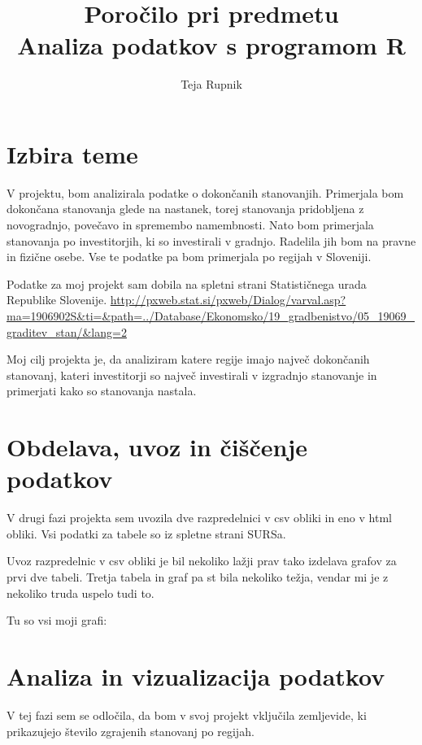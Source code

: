 \documentclass[11pt,a4paper]{article}
\begin{document}
\title{Poročilo pri predmetu \\
Analiza podatkov s programom R}
\author{Teja Rupnik}
\maketitle

\section{Izbira teme}

V projektu, bom analizirala podatke o dokončanih stanovanjih. Primerjala bom dokončana stanovanja glede na nastanek, torej stanovanja pridobljena z novogradnjo, povečavo in spremembo namembnosti. Nato bom primerjala stanovanja po investitorjih, ki so investirali v gradnjo. Radelila jih bom na pravne in fizične osebe. Vse te podatke pa bom primerjala po regijah v Sloveniji.

Podatke za moj projekt sam dobila na spletni strani Statističnega urada Republike Slovenije. 
\url{http://pxweb.stat.si/pxweb/Dialog/varval.asp?ma=1906902S&ti=&path=../Database/Ekonomsko/19_gradbenistvo/05_19069_graditev_stan/&lang=2}

Moj cilj projekta je, da analiziram katere regije imajo največ dokončanih stanovanj, kateri investitorji so največ investirali v izgradnjo stanovanje in primerjati kako so stanovanja nastala.

\newpage
\section{Obdelava, uvoz in čiščenje podatkov}
V drugi fazi projekta sem uvozila dve razpredelnici v csv obliki in eno v html obliki. Vsi podatki za tabele so iz spletne strani SURSa.

Uvoz razpredelnic v csv obliki je bil nekoliko lažji prav tako izdelava grafov za prvi dve tabeli. Tretja tabela in graf pa st bila nekoliko težja, vendar mi je z nekoliko truda uspelo tudi to.

Tu so vsi moji grafi:



\section{Analiza in vizualizacija podatkov}

V tej fazi sem se odločila, da bom v svoj projekt vključila zemljevide, ki prikazujejo število zgrajenih stanovanj po regijah.
\end{document}
